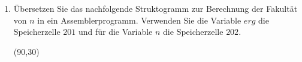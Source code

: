 \documentclass{bschlangaul-aufgabe}
\begin{document}
\begin{enumerate}

\newpage

\item Übersetzen Sie das nachfolgende Struktogramm zur Berechnung der
Fakultät von $n$ in ein Assemblerprogramm. Verwenden Sie die Variable
$erg$ die Speicherzelle $201$ und für die Variable $n$ die Speicherzelle
$202$.

\begin{center}
\begin{struktogramm}(90,30)
\whileend
\end{struktogramm}
\end{center}

\begin{bAntwort}
\begin{multicols}{2}


\columnbreak


\end{multicols}
\bigskip
\end{bAntwort}
\end{enumerate}
\end{document}

